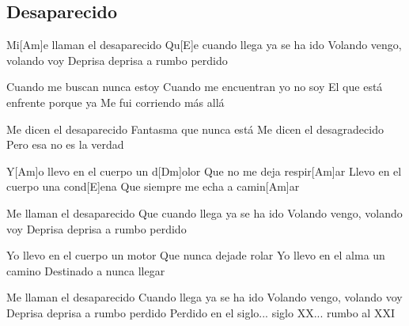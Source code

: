 \subsection*{Desaparecido   }
\begin{guitar}
Mi[Am]e llaman el desaparecido 
Qu[E]e cuando llega ya se ha ido 
Volando vengo, volando voy 
Deprisa deprisa a rumbo perdido 

Cuando me buscan nunca estoy 
Cuando me encuentran yo no soy 
El que está enfrente porque ya 
Me fui corriendo más allá 

Me dicen el desaparecido 
Fantasma que nunca está 
Me dicen el desagradecido 
Pero esa no es la verdad 



Y[Am]o llevo en el cuerpo un d[Dm]olor 
Que no me deja respir[Am]ar  
Llevo en el cuerpo una cond[E]ena 
Que siempre me echa a camin[Am]ar 



Me llaman el desaparecido 
Que cuando llega ya se ha ido 
Volando vengo, volando voy 
Deprisa deprisa a rumbo perdido 

Yo llevo en el cuerpo un motor 
Que nunca dejade rolar 
Yo llevo en el alma un camino 
Destinado a nunca llegar 

Me llaman el desaparecido 
Cuando llega ya se ha ido 
Volando vengo, volando voy 
Deprisa deprisa a rumbo perdido 
Perdido en el siglo... siglo XX... rumbo al XXI 
\end{guitar}
